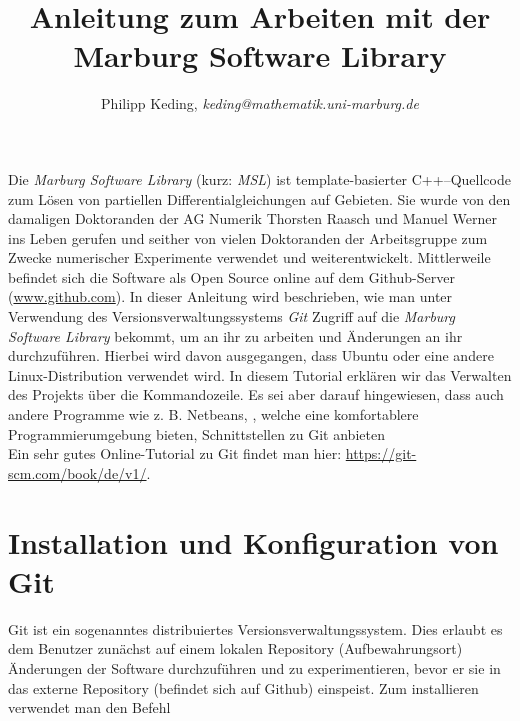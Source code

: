 \documentclass[a4paper,11pt,german]{article}
\title{Anleitung zum Arbeiten mit der Marburg Software Library}
\author{Philipp Keding, \emph{keding@mathematik.uni-marburg.de}}
\date{ }
\makeatletter
\renewcommand\tableofcontents{%
    \@starttoc{toc}%
}
\makeatother
\begin{document}
\maketitle

Die \emph{Marburg Software Library} (kurz: \emph{MSL}) ist template-basierter \textsc{C++}--Quellcode zum Lösen von partiellen Differentialgleichungen auf Gebieten. Sie wurde von den damaligen Doktoranden der AG Numerik Thorsten Raasch und Manuel Werner ins Leben gerufen und seither
von vielen Doktoranden der Arbeitsgruppe zum Zwecke numerischer Experimente verwendet und weiterentwickelt. Mittlerweile befindet sich die Software als Open Source online auf dem Github-Server (\url{www.github.com}).
In dieser Anleitung wird beschrieben, wie man unter Verwendung des Versionsverwaltungssystems
\emph{Git} Zugriff auf die \emph{Marburg Software Library} bekommt, um an ihr zu arbeiten und Änderungen an ihr durchzuführen. Hierbei wird davon ausgegangen, dass Ubuntu oder eine andere Linux-Distribution verwendet wird. 
In diesem Tutorial erklären wir das Verwalten des Projekts über die Kommandozeile. Es sei aber darauf hingewiesen, dass auch andere Programme wie
z. B. Netbeans, , welche eine komfortablere Programmierumgebung bieten, Schnittstellen zu Git anbieten
\\
Ein sehr gutes Online-Tutorial zu Git findet man hier: \url{https://git-scm.com/book/de/v1/}.

\tableofcontents

\section{Installation und Konfiguration von Git}

Git ist ein sogenanntes distribuiertes Versionsverwaltungssystem. Dies erlaubt es dem Benutzer zunächst auf einem lokalen Repository (Aufbewahrungsort) Änderungen der Software durchzuführen und zu experimentieren, bevor er sie in das externe Repository (befindet sich auf Github)
einspeist. Zum installieren verwendet man den Befehl
\end{document}
